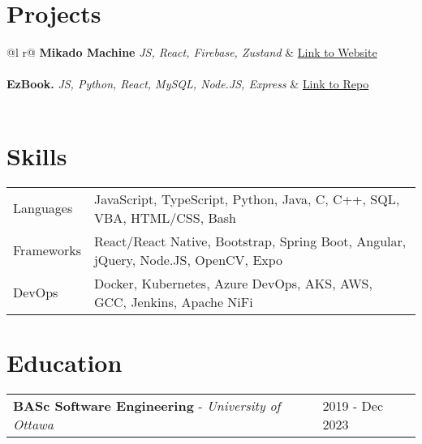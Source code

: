 \documentclass[a4paper,11pt]{article}
\begin{document}
\section{Projects}
\begin{tabularx}{\linewidth}{ @{}l r@{} }
\textbf{Mikado Machine} \textit{JS, React, Firebase, Zustand} & \hfill \href{https://mikadomachine.uottawaesports.ca/}{Link to Website} \\[3.75pt]
  \\
\textbf{EzBook.} \textit{JS, Python, React, MySQL, Node.JS, Express} & \hfill \href{https://github.com/Daanish-Khan/EzBook}{Link to Repo} \\[3.75pt]
  \\
\end{tabularx}
\section{Skills}
\begin{tabularx}{\linewidth}{@{}l X@{}}
Languages &  \normalsize{JavaScript, TypeScript, Python, Java, C, C++, SQL, VBA, HTML/CSS, Bash}\\
Frameworks  &  \normalsize{React/React Native, Bootstrap, Spring Boot, Angular, jQuery, Node.JS, OpenCV, Expo}\\ 
DevOps  &  \normalsize{Docker, Kubernetes, Azure DevOps, AKS, AWS, GCC, Jenkins, Apache NiFi}\\
\end{tabularx}
\section{Education}
\begin{tabularx}{\linewidth}{@{}l X@{}}	
\textbf{BASc Software Engineering} - \textit{University of Ottawa} & \hfill 2019 - Dec 2023 \\[3.75pt]
\end{tabularx}
\vfill
\end{document}
